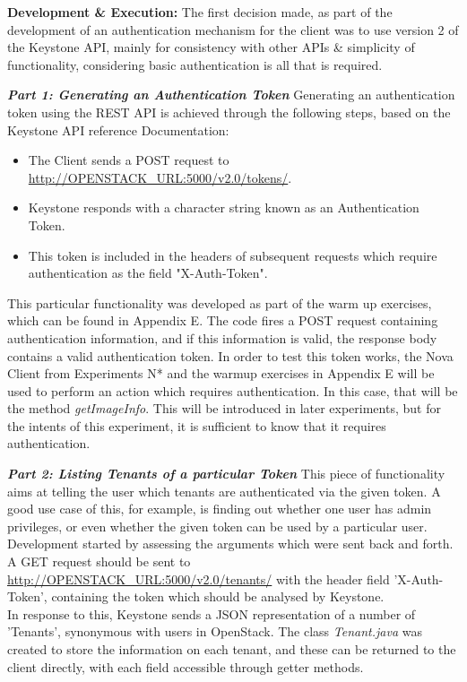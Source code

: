 \textbf{Development \& Execution:}
The first decision made, as part of the development of an authentication mechanism for the client was to use version 2 of the Keystone API, mainly for consistency with other APIs \& simplicity of functionality, considering basic authentication is all that is required. 

\textbf{\textit{Part 1: Generating an Authentication Token}}
Generating an authentication token using the REST API is achieved through the following steps, based on the Keystone API reference Documentation: \cite{keystoneref}

\begin{itemize}
\itemsep0em
 \item The Client sends a POST request to \url{http://OPENSTACK_URL:5000/v2.0/tokens/}.
 \item Keystone responds with a character string known as an Authentication Token. 
 \item This token is included in the headers of subsequent requests which require authentication as the field "X-Auth-Token".
\end{itemize} 

This particular functionality was developed as part of the warm up exercises, which can be found in Appendix E. The code fires a POST request containing authentication information, and if this information is valid, the response body contains a valid authentication token. 
In order to test this token works, the Nova Client from Experiments N* and the warmup exercises in Appendix E will be used to perform an action which requires authentication. In this case, that will be the method \textit{getImageInfo}. This will be introduced in later experiments, but for the intents of this experiment, it is sufficient to know that it requires authentication.  

\textbf{\textit{Part 2: Listing Tenants of a particular Token}} 
This piece of functionality aims at telling the user which tenants are authenticated via the given token. A good use case of this, for example, is finding out whether one user has admin privileges, or even whether the given token can be used by a particular user. 
Development started by assessing the arguments which were sent back and forth. A GET request should be sent to \url{http://OPENSTACK_URL:5000/v2.0/tenants/} with the header field 'X-Auth-Token', containing the token which should be analysed by Keystone. \\
In response to this, Keystone sends a JSON representation of a number of 'Tenants', synonymous with users in OpenStack. 
The class \textit{Tenant.java} was created to store the information on each tenant, and these can be returned to the client directly, with each field accessible through getter methods. 
 
